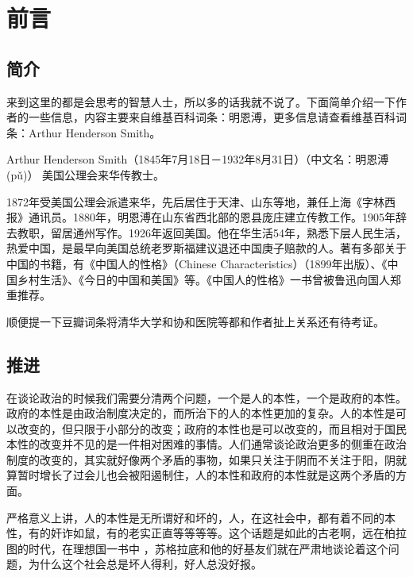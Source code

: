 \documentclass[12pt,oneside]{book}
\begin{document}
\frontmatter

\author{亚瑟·亨·史密斯}
\titleLA

\chapter*{前言}
\begin{common-format}
\section*{简介}
来到这里的都是会思考的智慧人士，所以多的话我就不说了。下面简单介绍一下作者的一些信息，内容主要来自维基百科词条：明恩溥，更多信息请查看维基百科词条：Arthur Henderson Smith。

Arthur Henderson Smith（1845年7月18日－1932年8月31日）（中文名：明恩溥(pǔ)） 美国公理会来华传教士。

1872年受美国公理会派遣来华，先后居住于天津、山东等地，兼任上海《字林西报》通讯员。1880年，明恩溥在山东省西北部的恩县庞庄建立传教工作。1905年辞去教职，留居通州写作。1926年返回美国。他在华生活54年，熟悉下层人民生活，热爱中国，是最早向美国总统老罗斯福建议退还中国庚子赔款的人。著有多部关于中国的书籍，有《中国人的性格》（Chinese Characteristics）（1899年出版）、《中国乡村生活》、《今日的中国和美国》等。《中国人的性格》一书曾被鲁迅向国人郑重推荐。

顺便提一下豆瓣词条将清华大学和协和医院等都和作者扯上关系还有待考证。


\section*{推进}
 在谈论政治的时候我们需要分清两个问题，一个是人的本性，一个是政府的本性。政府的本性是由政治制度决定的，而所治下的人的本性更加的复杂。人的本性是可以改变的，但只限于小部分的改变；政府的本性也是可以改变的，而且相对于国民本性的改变并不见的是一件相对困难的事情。人们通常谈论政治更多的侧重在政治制度的改变的，其实就好像两个矛盾的事物，如果只关注于阴而不关注于阳，阴就算暂时增长了过会儿也会被阳遏制住，人的本性和政府的本性就是这两个矛盾的方面。

严格意义上讲，人的本性是无所谓好和坏的，人，在这社会中，都有着不同的本性，有的奸诈如鼠，有的老实正直等等等等。这个话题是如此的古老啊，远在柏拉图的时代，在理想国一书中 ，苏格拉底和他的好基友们就在严肃地谈论着这个问题，为什么这个社会总是坏人得利，好人总没好报。


\end{common-format}
\end{document}
